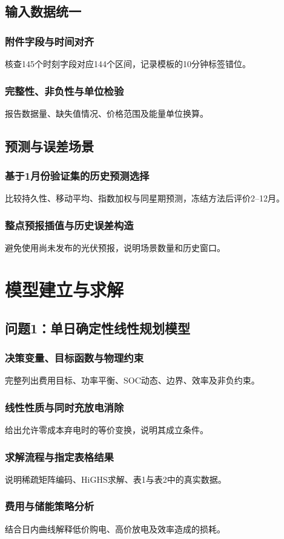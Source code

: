 \documentclass[UTF8,a4paper,zihao=-4]{ctexart}
\begin{document}
\subsection{输入数据统一}
\subsubsection{附件字段与时间对齐}核查145个时刻字段对应144个区间，记录模板的10分钟标签错位。
\subsubsection{完整性、非负性与单位检验}报告数据量、缺失值情况、价格范围及能量单位换算。
\subsection{预测与误差场景}
\subsubsection{基于1月份验证集的历史预测选择}比较持久性、移动平均、指数加权与同星期预测，冻结方法后评价2--12月。
\subsubsection{整点预报插值与历史误差构造}避免使用尚未发布的光伏预报，说明场景数量和历史窗口。
\section{模型建立与求解}
\subsection{问题1：单日确定性线性规划模型}
\subsubsection{决策变量、目标函数与物理约束}完整列出费用目标、功率平衡、SOC动态、边界、效率及非负约束。
\subsubsection{线性性质与同时充放电消除}给出允许零成本弃电时的等价变换，说明其成立条件。
\subsubsection{求解流程与指定表格结果}说明稀疏矩阵编码、HiGHS求解、表1与表2中的真实数据。
\subsubsection{费用与储能策略分析}结合日内曲线解释低价购电、高价放电及效率造成的损耗。
\end{document}
